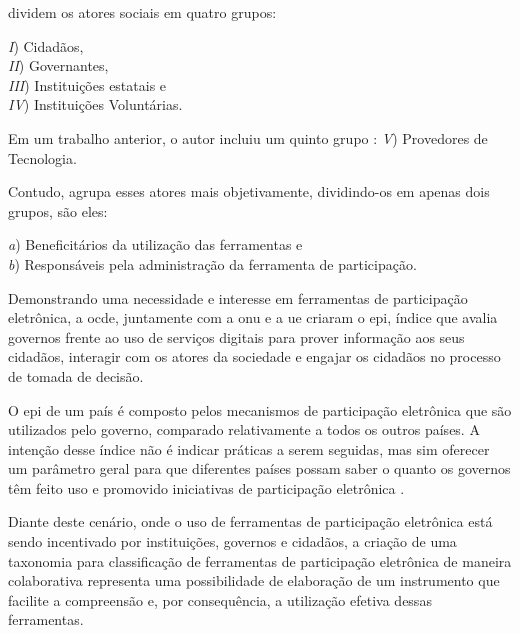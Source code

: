 \par
{} dividem os atores sociais em quatro grupos: 

\begin{minipage}{.66\textwidth}	
   \textit{I}) Cidadãos, \\
   \textit{II}) Governantes, \\
   \textit{III}) Instituições estatais e \\
   \textit{IV}) Instituições Voluntárias. \\
\end{minipage}

\par
Em um trabalho anterior, o autor incluiu um quinto grupo \cite{macintosh2006evaluating}:
\textit{V}) Provedores de Tecnologia.
\par
Contudo,  agrupa esses atores mais objetivamente, dividindo-os em apenas dois grupos, são eles:\\
\begin{minipage}{.75\textwidth}	
   \textit{a}) Beneficitários da utilização das ferramentas e \\
   \textit{b}) Responsáveis pela administração da ferramenta de participação.  \\
\end{minipage}

\par
Demonstrando uma necessidade e interesse em ferramentas de participação eletrônica, a \acrfull{ocde}, juntamente com a \acrshort{onu} e a \acrfull{ue} criaram o \acrfull{epi}, 
índice que avalia governos frente ao uso de serviços digitais para prover informação aos seus cidadãos, interagir com os atores da sociedade e engajar os cidadãos no processo de tomada de decisão. 

\par 
O \acrshort{epi} de um país é composto pelos mecanismos de participação eletrônica que são utilizados pelo governo, comparado relativamente a todos os outros países.
A intenção desse índice não é indicar práticas a serem seguidas, mas sim oferecer um parâmetro geral para que diferentes países possam saber o quanto os governos têm 
feito uso e promovido iniciativas de participação eletrônica \cite{onu2018} .

\par
Diante deste cenário, onde o uso de ferramentas de participação eletrônica está sendo incentivado por instituições, governos e cidadãos, a criação de uma taxonomia para 
classificação de ferramentas de participação eletrônica de maneira colaborativa representa uma possibilidade de elaboração de um instrumento que facilite a compreensão e, 
por consequência, a utilização efetiva dessas ferramentas. 

